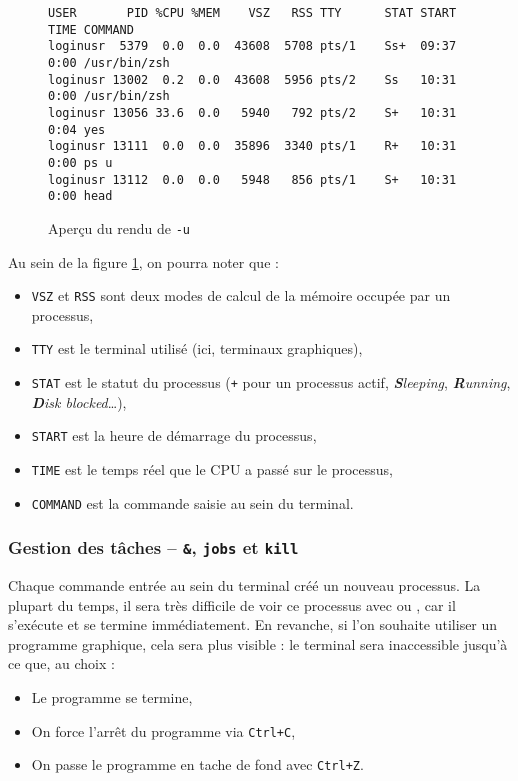 \begin{figure}[bh!]
    \centering
    \begin{verbatim}
USER       PID %CPU %MEM    VSZ   RSS TTY      STAT START   TIME COMMAND
loginusr  5379  0.0  0.0  43608  5708 pts/1    Ss+  09:37   0:00 /usr/bin/zsh
loginusr 13002  0.2  0.0  43608  5956 pts/2    Ss   10:31   0:00 /usr/bin/zsh
loginusr 13056 33.6  0.0   5940   792 pts/2    S+   10:31   0:04 yes
loginusr 13111  0.0  0.0  35896  3340 pts/1    R+   10:31   0:00 ps u
loginusr 13112  0.0  0.0   5948   856 pts/1    S+   10:31   0:00 head
\end{verbatim}
    \vspace{-\baselineskip}\caption{Aperçu du rendu de  \texttt{-u}}
    \label{fig:ps}
\end{figure}
Au sein de la figure \ref{fig:ps}, on pourra noter que : 
\begin{itemize}
    \item \texttt{VSZ} et \texttt{RSS} sont deux modes de calcul de la mémoire occupée par un processus,
    \item \texttt{TTY} est le terminal utilisé (ici, terminaux graphiques),
    \item \texttt{STAT} est le statut du processus (\texttt{+} pour un processus actif, \textit{\textbf{S}leeping}, \textit{\textbf{R}unning}, \textit{\textbf{D}isk blocked}\dots),
    \item \texttt{START} est la heure de démarrage du processus,
    \item \texttt{TIME} est le temps réel que le CPU a passé sur le processus,
    \item \texttt{COMMAND} est la commande saisie au sein du terminal.
\end{itemize}


\newpage
\subsubsection{Gestion des tâches -- \texttt{\&}, \texttt{jobs} et \texttt{kill}} \label{sec:tasks}

Chaque commande entrée au sein du terminal créé un nouveau processus. La plupart du temps, il sera très difficile de voir ce processus avec  ou , car il s'exécute et se termine immédiatement. En revanche, si l'on souhaite utiliser un programme graphique, cela sera plus visible : le terminal sera inaccessible jusqu'à ce que, au choix : 
\begin{itemize}
    \item Le programme se termine,
    \item On force l'arrêt du programme via \texttt{Ctrl+C},
    \item On passe le programme en tache de fond avec \texttt{Ctrl+Z}.
\end{itemize}

